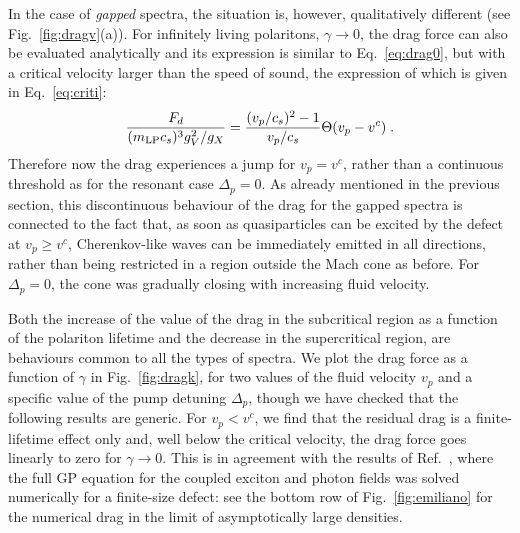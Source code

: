 In the case of \emph{gapped} spectra, the situation is, however,
qualitatively different (see Fig.~\ref{fig:dragv}(a)). For infinitely
living polaritons, $\gamma \to 0$, the drag force can also be
evaluated analytically and its expression is similar to
Eq.~\eqref{eq:drag0}, but with a critical velocity larger than the
speed of sound, the expression of which is given in
Eq.~\eqref{eq:criti}:
%
\begin{equation}
  \frac{F_d}{(m_{\text{LP}}c_s)^3 g_V^2/g_X}=\frac{(v_p/c_s)^2 - 1}{v_p/c_s}
  \Theta(v_p - v^c)\; .
\end{equation}
%
Therefore now the drag experiences a jump for $v_p=v^c$, rather than a
continuous threshold as for the resonant case $\Delta_p=0$. As already
mentioned in the previous section, this discontinuous behaviour of the
drag for the gapped spectra is connected to the fact that, as soon as
quasiparticles can be excited by the defect at $v_p\ge v^c$,
Cherenkov-like waves can be immediately emitted in all directions,
rather than being restricted in a region outside the Mach cone as
before. For $\Delta_p=0$, the cone was gradually closing with
increasing  fluid velocity.

Both the increase of the value of the drag in the subcritical region
as a function of the polariton lifetime and the decrease in the
supercritical region, are behaviours common to all the types of
spectra. We plot the drag force as a function of $\gamma$ in
Fig.~\ref{fig:dragk}, for two values of the fluid velocity $v_p$ and a
specific value of the pump detuning $\Delta_p$, though we have checked
that the following results are generic. For $v_p < v^c$, we find that
the residual drag is a finite-lifetime effect only and, well below the
critical velocity, the drag force goes linearly to zero for
$\gamma \to 0$. This is in agreement with the results of
Ref.~\cite{Cancellieri_2010}, where the full GP equation for the
coupled exciton and photon fields was solved numerically for a
finite-size defect: see the bottom row of Fig.~\ref{fig:emiliano} for
the numerical drag in the limit of asymptotically large densities.

